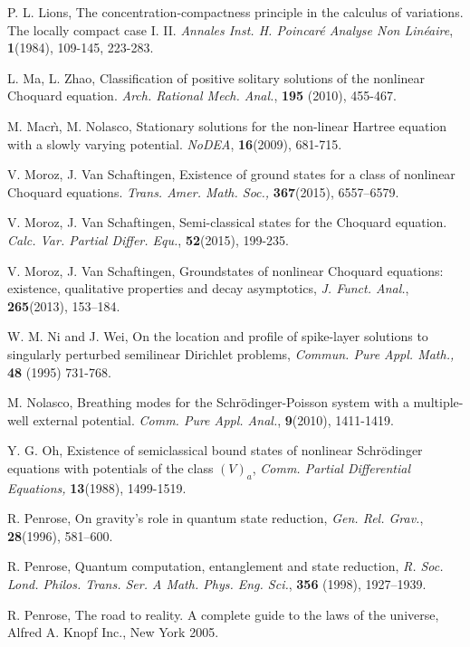 \documentclass[12pt,reqno]{amsart}
\numberwithin{equation}{section}
\begin{document}
\begin{thebibliography}{100}
 P. L. Lions, The concentration-compactness principle in the calculus of variations. The locally compact case I. II. {\it Annales Inst.
H. Poincar\'{e} Analyse Non Lin\'{e}aire}, {\bf 1}(1984), 109-145, 223-283.

 L. Ma, L. Zhao, Classification of positive solitary solutions of the nonlinear Choquard equation. {\it Arch. Rational Mech. Anal.}, {\bf195} (2010), 455-467.

 M. Macr\`{\i}, M. Nolasco, Stationary solutions for the non-linear Hartree equation with a slowly varying potential. {\it NoDEA}, {\bf 16}(2009), 681-715.

 V. Moroz, J. Van Schaftingen, Existence of ground states for a class of nonlinear Choquard equations. {\it Trans. Amer. Math. Soc., }{\bf 367}(2015), 6557--6579.

 V. Moroz, J. Van Schaftingen, Semi-classical states for the Choquard equation.  {\it Calc. Var. Partial Differ. Equ.}, {\bf52}(2015), 199-235.

 V. Moroz, J. Van Schaftingen, Groundstates of nonlinear Choquard equations: existence, qualitative properties and decay asymptotics, {\it J. Funct. Anal.}, {\bf 265}(2013), 153--184.

 W. M. Ni and J. Wei, On the location and profile of spike-layer solutions to singularly perturbed semilinear Dirichlet problems, {\it Commun. Pure Appl. Math., }  {\bf 48} (1995) 731-768.

 M. Nolasco, Breathing modes for the Schr\"{o}dinger-Poisson system with a multiple-well external potential. {\it Comm. Pure Appl. Anal.}, {\bf9}(2010), 1411-1419.

 Y. G. Oh,  Existence of semiclassical bound states of nonlinear Schr\"{o}dinger equations
with potentials of the class $(V)_a$, {\it Comm. Partial Differential
Equations,} {\bf 13}(1988), 1499-1519.

 R. Penrose, On gravity's role in quantum state reduction, {\it Gen. Rel. Grav.}, {\bf 28}(1996), 581--600.

 R. Penrose, Quantum computation, entanglement and state reduction, {\it R. Soc. Lond. Philos. Trans. Ser. A Math. Phys. Eng. Sci.}, {\bf356} (1998), 1927--1939.

 R. Penrose, The road to reality. A complete guide to the laws of the universe, Alfred A. Knopf Inc., New York 2005.


\end{thebibliography}
\end{document}
